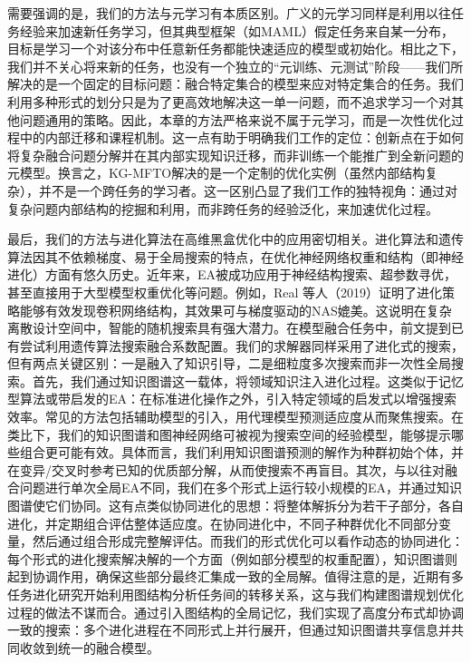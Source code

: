 \documentclass[../main.tex]{subfiles}
\begin{document}
需要强调的是，我们的方法与元学习有本质区别。广义的元学习同样是利用以往任务经验来加速新任务学习，但其典型框架（如MAML）假定任务来自某一分布，目标是学习一个对该分布中任意新任务都能快速适应的模型或初始化。相比之下，我们并不关心将来新的任务，也没有一个独立的“元训练、元测试”阶段——我们所解决的是一个固定的目标问题：融合特定集合的模型来应对特定集合的任务。我们利用多种形式的划分只是为了更高效地解决这一单一问题，而不追求学习一个对其他问题通用的策略。因此，本章的方法严格来说不属于元学习，而是一次性优化过程中的内部迁移和课程机制。这一点有助于明确我们工作的定位：创新点在于如何将复杂融合问题分解并在其内部实现知识迁移，而非训练一个能推广到全新问题的元模型。换言之，KG-MFTO解决的是一个定制的优化实例（虽然内部结构复杂），并不是一个跨任务的学习者。这一区别凸显了我们工作的独特视角：通过对复杂问题内部结构的挖掘和利用，而非跨任务的经验泛化，来加速优化过程。

最后，我们的方法与进化算法在高维黑盒优化中的应用密切相关。进化算法和遗传算法因其不依赖梯度、易于全局搜索的特点，在优化神经网络权重和结构（即神经进化）方面有悠久历史。近年来，EA被成功应用于神经结构搜索、超参数寻优，甚至直接用于大型模型权重优化等问题。例如，Real 等人（2019）证明了进化策略能够有效发现卷积网络结构，其效果可与梯度驱动的NAS媲美。这说明在复杂离散设计空间中，智能的随机搜索具有强大潜力。在模型融合任务中，前文提到已有尝试利用遗传算法搜索融合系数配置。我们的求解器同样采用了进化式的搜索，但有两点关键区别：一是融入了知识引导，二是细粒度多次搜索而非一次性全局搜索。首先，我们通过知识图谱这一载体，将领域知识注入进化过程。这类似于记忆型算法或带启发的EA：在标准进化操作之外，引入特定领域的启发式以增强搜索效率。常见的方法包括辅助模型的引入，用代理模型预测适应度从而聚焦搜索。在类比下，我们的知识图谱和图神经网络可被视为搜索空间的经验模型，能够提示哪些组合更可能有效。具体而言，我们利用知识图谱预测的解作为种群初始个体，并在变异/交叉时参考已知的优质部分解，从而使搜索不再盲目。其次，与以往对融合问题进行单次全局EA不同，我们在多个形式上运行较小规模的EA，并通过知识图谱使它们协同。这有点类似协同进化的思想：将整体解拆分为若干子部分，各自进化，并定期组合评估整体适应度。在协同进化中，不同子种群优化不同部分变量，然后通过组合形成完整解评估。而我们的形式优化可以看作动态的协同进化：每个形式的进化搜索解决解的一个方面（例如部分模型的权重配置），知识图谱则起到协调作用，确保这些部分最终汇集成一致的全局解。值得注意的是，近期有多任务进化研究开始利用图结构分析任务间的转移关系，这与我们构建图谱规划优化过程的做法不谋而合。通过引入图结构的全局记忆，我们实现了高度分布式却协调一致的搜索：多个进化进程在不同形式上并行展开，但通过知识图谱共享信息并共同收敛到统一的融合模型。
\end{document}

